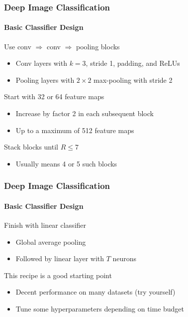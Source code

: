 \documentclass[xetex,professionalfont]{beamer}
\begin{document}
\begin{frame}
\frametitle{Deep Image Classification}
\framesubtitle{Basic Classifier Design}

Use conv $\Rightarrow$ conv $\Rightarrow$ pooling blocks
\begin{itemize}
    \item Conv layers with $k=3$, stride 1, padding, and ReLUs
    \item Pooling layers with $2\times2$ max-pooling with stride 2
\end{itemize}

\bigskip

Start with 32 or 64 feature maps %
\begin{itemize}
    \item Increase by factor 2 in each subsequent block
    \item Up to a maximum of 512 feature maps
\end{itemize}

\bigskip

Stack blocks until $R\leq7$
\begin{itemize}
    \item Usually means 4 or 5 such blocks %
\end{itemize}

\end{frame}


\begin{frame}
\frametitle{Deep Image Classification}
\framesubtitle{Basic Classifier Design}

Finish with linear classifier
\begin{itemize}
    \item Global average pooling
    \item Followed by linear layer with $T$ neurons
\end{itemize}

\bigskip

This recipe is a good starting point
\begin{itemize}
    \item Decent performance on many datasets (try yourself)
    \item Tune some hyperparameters depending on time budget
\end{itemize}

\end{frame}
\end{document}
